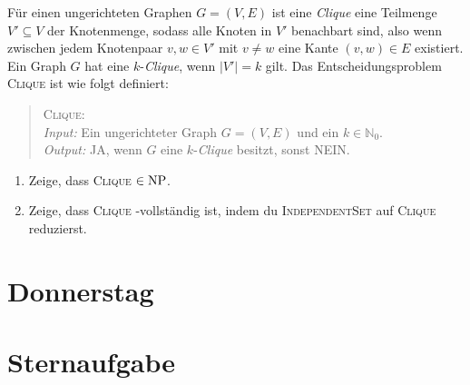\documentclass{uebung_cs}
\begin{document}
\begin{aufgabe}[Clique]
	Für einen ungerichteten Graphen $G = (V,E)$  ist eine \textit{Clique} eine Teilmenge $V' \subseteq V$ der Knotenmenge, sodass alle Knoten in $V'$ benachbart sind, also wenn zwischen jedem Knotenpaar $v,w \in V'$ mit $v \neq w$ eine Kante $(v,w) \in E$ existiert. Ein Graph $G$ hat eine $k$-\textit{Clique}, wenn $|V'| = k$ gilt. Das Entscheidungsproblem \textsc{Clique} ist wie folgt definiert:
	\begin{quote}
		\textsc{Clique}:\\
		\textit{Input:} Ein ungerichteter Graph $G = (V,E)$ und ein $k \in \mathbb{N}_0$.\\
		\textit{Output:} \glqq JA\grqq{}, wenn $G$ eine $k$-\textit{Clique} besitzt, sonst \glqq NEIN\grqq{}.
	\end{quote}
	\begin{enumerate}
		\item Zeige, dass \textsc{Clique} $\in \mathrm{NP}$.
		\item Zeige, dass \textsc{Clique} \NP-vollständig ist, indem du \textsc{IndependentSet} auf \textsc{Clique} reduzierst.
	\end{enumerate}
\end{aufgabe}


\section*{Donnerstag}


\section*{Sternaufgabe}

\begin{aufgabe}
	
\end{aufgabe}
\end{document}
